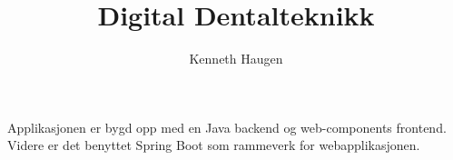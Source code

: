\documentclass{article}
\title{Digital Dentalteknikk}
\author{Kenneth Haugen}
\begin{document}
\maketitle

Applikasjonen er bygd opp med en Java backend og 
web-components frontend.
Videre er det benyttet Spring Boot som rammeverk for 
webapplikasjonen.
\end{document}
